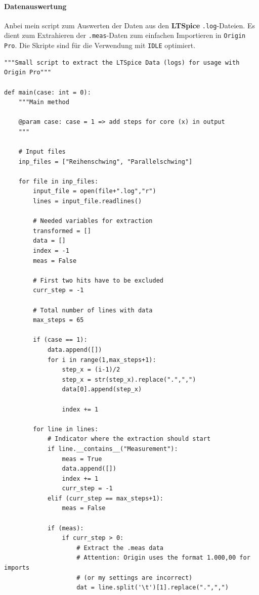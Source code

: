 \documentclass[10pt,a4paper]{article}
\begin{document}
\paragraph{Datenauswertung}
\begin{flushleft}
Anbei mein script zum Auswerten der Daten aus den \textbf{LTSpice} \texttt{.log}-Dateien. Es dient zum Extrahieren der \texttt{.meas}-Daten zum einfachen Importieren in \texttt{Origin Pro}. Die Skripte sind für die Verwendung mit \texttt{IDLE} optimiert.

\scriptsize
\begin{verbatim}
"""Small script to extract the LTSpice Data (logs) for usage with Origin Pro"""

def main(case: int = 0):
    """Main method

    @param case: case = 1 => add steps for core (x) in output
    """

    # Input files
    inp_files = ["Reihenschwing", "Parallelschwing"]

    for file in inp_files:
        input_file = open(file+".log","r")
        lines = input_file.readlines()

        # Needed variables for extraction
        transformed = []
        data = []
        index = -1
        meas = False

        # First two hits have to be excluded
        curr_step = -1

        # Total number of lines with data
        max_steps = 65

        if (case == 1):
            data.append([])
            for i in range(1,max_steps+1):
                step_x = (i-1)/2
                step_x = str(step_x).replace(".",",")
                data[0].append(step_x)

                index += 1

        for line in lines:
            # Indicator where the extraction should start
            if line.__contains__("Measurement"):
                meas = True
                data.append([])
                index += 1
                curr_step = -1
            elif (curr_step == max_steps+1):
                meas = False

            if (meas):
                if curr_step > 0:
                    # Extract the .meas data
                    # Attention: Origin uses the format 1.000,00 for imports
                    # (or my settings are incorrect)
                    dat = line.split('\t')[1].replace(".",",")


\end{verbatim}
\end{flushleft}
\end{document}

